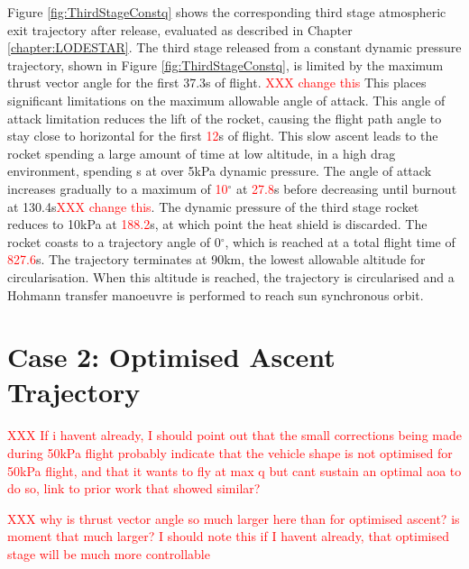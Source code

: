Figure \ref{fig:ThirdStageConstq} shows the corresponding third stage atmospheric exit trajectory after release, evaluated as described in Chapter \ref{chapter:LODESTAR}. The third stage released from a constant dynamic pressure trajectory, shown in Figure \ref{fig:ThirdStageConstq}, is limited by the maximum thrust vector angle for the first 37.3s of flight. \textcolor{red}{XXX change this} This places significant limitations on the maximum allowable angle of attack. This angle of attack limitation reduces the lift of the rocket, causing the flight path angle to stay close to horizontal for the first \textcolor{red}{12}s of flight. This slow ascent leads to the rocket spending a large amount of time at low altitude, in a high drag environment, spending \thirdqOverFiveConstqNoReturn s at over 5kPa dynamic pressure. The angle of attack increases gradually to a maximum of \textcolor{red}{10}$^\circ$ at \textcolor{red}{27.8}s before decreasing until burnout at 130.4s\textcolor{red}{XXX change this}. The dynamic pressure of the third stage rocket reduces to 10kPa at \textcolor{red}{188.2}s, at which point the heat shield is discarded. The rocket coasts to a trajectory angle of 0$^\circ$, which is reached at a total flight time of \textcolor{red}{827.6}s. The trajectory terminates at 90km, the lowest allowable altitude for circularisation. 
When this altitude is reached, the trajectory is circularised and a Hohmann transfer manoeuvre is performed to reach sun synchronous orbit.






\section{Case 2: Optimised Ascent Trajectory}\label{sec:optimisednoreturn}

\textcolor{red}{XXX If i havent already, I should point out that the small corrections being made during 50kPa flight probably indicate that the vehicle shape is not optimised for 50kPa flight, and that it wants to fly at max q but cant sustain an optimal aoa to do so, link to prior work that showed similar?}

\textcolor{red}{XXX why is thrust vector angle so much larger here than for optimised ascent? is moment that much larger? I should note this if I havent already, that optimised stage will be much more controllable}

